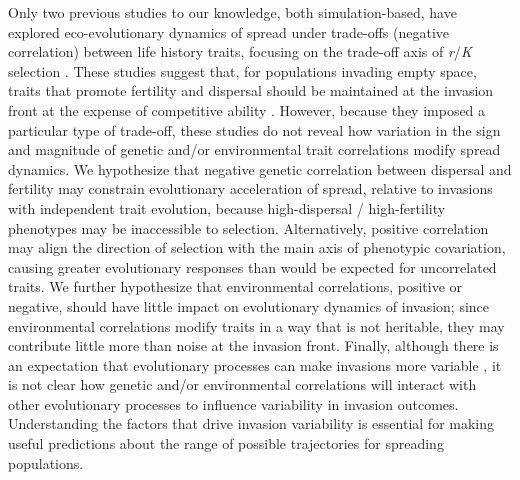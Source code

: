 Only two previous studies to our knowledge, both simulation-based, have explored eco-evolutionary dynamics of spread under trade-offs (negative correlation) between life history traits, focusing on the trade-off axis of \textit{r}/\textit{K} selection \citep{burton_trade-offs_2010,perkins_after_2016}. These studies suggest that, for populations invading empty space, traits that promote fertility and dispersal should be maintained at the invasion front at the expense of competitive ability \citep{burton_trade-offs_2010,perkins_after_2016}. However, because they imposed a particular type of trade-off, these studies do not reveal how variation in the sign and magnitude of genetic and/or environmental trait correlations modify spread dynamics. We hypothesize that negative genetic correlation between dispersal and fertility may constrain evolutionary acceleration of spread, relative to invasions with independent trait evolution, because high-dispersal / high-fertility phenotypes may be inaccessible to selection. %
Alternatively, positive correlation may align the direction of selection with the main axis of phenotypic covariation, causing greater evolutionary responses than would be expected for uncorrelated traits. We further hypothesize that environmental correlations, positive or negative, should have little impact on evolutionary dynamics of invasion; since environmental correlations modify traits in a way that is not heritable, they may contribute little more than noise at the invasion front. Finally, although there is an expectation that evolutionary processes can make invasions more variable \citep{phillips_evolutionary_2015,ochocki_rapid_2017,weiss-lehman_rapid_2017}, it is not clear how genetic and/or environmental correlations will interact with other evolutionary processes to influence variability in invasion outcomes. Understanding the factors that drive invasion variability is essential for making useful predictions about the range of possible trajectories for spreading populations.

